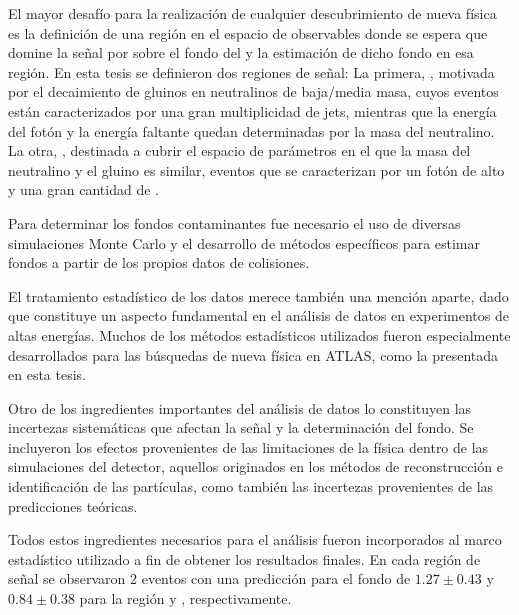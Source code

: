 
El mayor desafío para la realización de cualquier descubrimiento de nueva física
es la definición de una región en el espacio de observables donde se espera que
domine la señal por sobre el fondo del {\SM} y la estimación de dicho fondo en
esa región. En esta tesis se definieron dos regiones de señal: La primera,
{\SRL}, motivada por el decaimiento de gluinos en neutralinos de baja/media
masa, cuyos eventos están caracterizados por una gran multiplicidad de jets,
mientras que la energía del fotón y la energía faltante quedan determinadas por
la masa del neutralino. La otra, {\SRH}, destinada a cubrir el espacio de
parámetros en el que la masa del neutralino y el gluino es similar, eventos que
se caracterizan por un fotón de alto {\pt} y una gran cantidad de {\met}.

Para determinar los fondos contaminantes fue necesario el uso de diversas
simulaciones Monte Carlo y el desarrollo de métodos específicos para estimar fondos a
partir de los propios datos de colisiones.

El tratamiento estadístico de los datos merece también una mención aparte, dado
que constituye un aspecto fundamental en el análisis de datos en experimentos de
altas energías. Muchos de los métodos estadísticos utilizados fueron
especialmente desarrollados para las búsquedas de nueva física en ATLAS, como la
presentada en esta tesis.

Otro de los ingredientes importantes del análisis de datos lo constituyen las
incertezas sistemáticas que afectan la señal y la determinación del fondo. Se
incluyeron los efectos provenientes de las limitaciones de la física dentro de
las simulaciones del detector, aquellos originados en los métodos de
reconstrucción e identificación de las partículas, como también las incertezas
provenientes de las predicciones teóricas.

Todos estos ingredientes necesarios para el análisis fueron incorporados al
marco estadístico utilizado a fin de obtener los resultados finales. En cada
región de señal se observaron 2 eventos con una predicción para el fondo de
$1.27\pm0.43$ y $0.84\pm 0.38$ para la región {\SRL} y {\SRH}, respectivamente.


